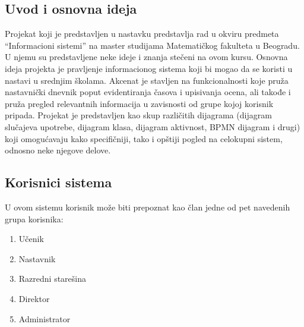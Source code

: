 \documentclass{article}
\begin{document}
\subsection{Uvod i osnovna ideja}
	Projekat koji je predstavljen u nastavku predstavlja rad u okviru predmeta ``Informacioni sistemi'' na master studijama Matematičkog fakulteta u Beogradu. U njemu su predstavljene neke ideje i znanja stečeni na ovom kursu.
	Osnovna ideja projekta je pravljenje informacionog sistema koji bi mogao da se koristi u nastavi u srednjim školama. Akcenat je stavljen na funkcionalnosti koje pruža nastavnički dnevnik poput evidentiranja časova i upisivanja ocena, ali takođe i pruža pregled relevantnih informacija u zavisnosti od grupe kojoj korisnik pripada. Projekat je predstavljen kao skup različitih dijagrama (dijagram slučajeva upotrebe, dijagram klasa, dijagram aktivnost, BPMN dijagram i drugi) koji omogućavaju kako specifičniji, tako i opštiji pogled na celokupni sistem, odnosno neke njegove delove.

\subsection{Korisnici sistema}
	U ovom sistemu korisnik može biti prepoznat kao član jedne od pet navedenih grupa korisnika:
\begin{enumerate}
	\item Učenik
	\item Nastavnik
	\item Razredni starešina
	\item Direktor
	\item Administrator
\end{enumerate}
\end{document}
